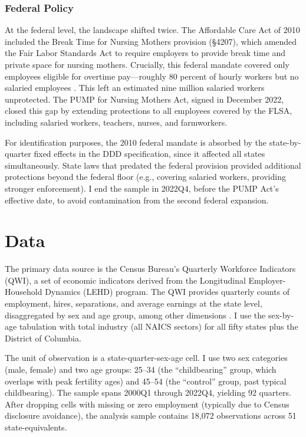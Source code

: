 \documentclass[12pt]{article}
\begin{document}
\subsubsection*{Federal Policy} At the federal level, the landscape shifted twice. The Affordable Care Act of 2010 included the Break Time for Nursing Mothers provision (\S4207), which amended the Fair Labor Standards Act to require employers to provide break time and private space for nursing mothers. Crucially, this federal mandate covered only employees eligible for overtime pay---roughly 80 percent of hourly workers but no salaried employees \citep{dol2010}. This left an estimated nine million salaried workers unprotected. The PUMP for Nursing Mothers Act, signed in December 2022, closed this gap by extending protections to all employees covered by the FLSA, including salaried workers, teachers, nurses, and farmworkers.

For identification purposes, the 2010 federal mandate is absorbed by the state-by-quarter fixed effects in the DDD specification, since it affected all states simultaneously. State laws that predated the federal provision provided additional protections beyond the federal floor (e.g., covering salaried workers, providing stronger enforcement). I end the sample in 2022Q4, before the PUMP Act's effective date, to avoid contamination from the second federal expansion.


\section{Data}
\label{sec:data}

The primary data source is the Census Bureau's Quarterly Workforce Indicators (QWI), a set of economic indicators derived from the Longitudinal Employer-Household Dynamics (LEHD) program. The QWI provides quarterly counts of employment, hires, separations, and average earnings at the state level, disaggregated by sex and age group, among other dimensions \citep{abowd2009}. I use the sex-by-age tabulation with total industry (all NAICS sectors) for all fifty states plus the District of Columbia.

The unit of observation is a state-quarter-sex-age cell. I use two sex categories (male, female) and two age groups: 25--34 (the ``childbearing'' group, which overlaps with peak fertility ages) and 45--54 (the ``control'' group, past typical childbearing). The sample spans 2000Q1 through 2022Q4, yielding 92 quarters. After dropping cells with missing or zero employment (typically due to Census disclosure avoidance), the analysis sample contains 18,072 observations across 51 state-equivalents.
\end{document}
